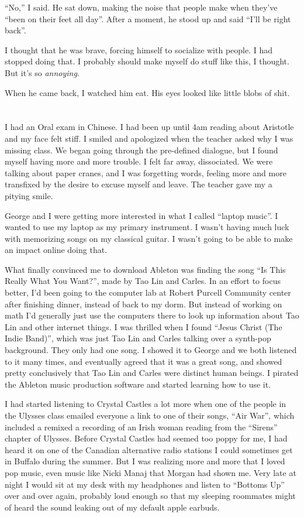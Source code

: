``No,'' I said.  He sat down, making the noise that people make when they've
``been on their feet all day''.  After a moment, he stood up and said ``I'll be
right back''.  

I thought that he was brave, forcing himself to socialize with people.  I had
stopped doing that.  I probably should make myself do stuff like this, I
thought.  But it's so \textit{annoying}. 

When he came back, I watched him eat.  His eyes looked like little blobs of
shit.

\section{}

I had an Oral exam in Chinese.  I had been up until 4am reading about Aristotle
and my face felt stiff.  I smiled and apologized when the teacher asked why I
was missing class.  We began going through the pre-defined dialogue, but I
found myself having more and more trouble.  I felt far away, dissociated.  We
were talking about paper cranes, and I was forgetting words, feeling more and
more transfixed by the desire to excuse myself and leave.  The teacher gave my
a pitying smile.  

George and I were getting more interested in what I called ``laptop music''.  I
wanted to use my laptop as my primary instrument.  I wasn't having much luck
with memorizing songs on my classical guitar.  I wasn't going to be able to make
an impact online doing that.  

What finally convinced me to download Ableton was finding the song ``Is This
Really What You Want?'', made by Tao Lin and Carles.  In an effort to focus
better, I'd been going to the computer lab at Robert Purcell Community center
after finishing dinner, instead of back to my dorm.  But instead of working on
math I'd generally just use the computers there to look up information about Tao
Lin and other internet things.  I was thrilled when I found ``Jesus Christ (The
Indie Band)'', which was just Tao Lin and Carles talking over a synth-pop
background.  They only had one song.  I showed it to George and we both listened
to it many times, and eventually agreed that it was a great song, and showed
pretty conclusively that Tao Lin and Carles were distinct human beings.  I
pirated the Ableton music production software and started learning how to use
it.  

I had started listening to Crystal Castles a lot more when one of the people in
the Ulysses class emailed everyone a link to one of their songs, ``Air War'',
which included a remixed a recording of an Irish woman reading from the
``Sirens'' chapter of Ulysses.  Before Crystal Castles had seemed too poppy for
me, I had heard it on one of the Canadian alternative radio stations I could
sometimes get in Buffalo during the summer.  But I was realizing more and more
that I loved pop music, even music like Nicki Manaj that Morgan had shown me.
Very late at night I would sit at my desk with my headphones and listen to
``Bottoms Up'' over and over again, probably loud enough so that my sleeping
roommates might of heard the sound leaking out of my default apple earbuds.


